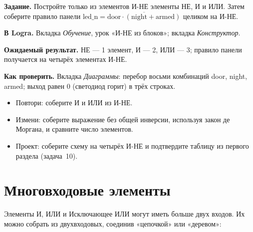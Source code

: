 \begin{diybox}[Всё из И-НЕ]
\textbf{Задание.} Постройте только из элементов И-НЕ элементы НЕ, И и ИЛИ.
Затем соберите правило панели $\text{led\_n}=\overline{\text{door}\cdot
(\text{night}+\text{armed})}$ целиком на И-НЕ.\par
\textbf{В Logra.} Вкладка \emph{Обучение}, урок «И-НЕ из блоков»; вкладка
\emph{Конструктор}.\par
\textbf{Ожидаемый результат.} НЕ --- 1 элемент, И --- 2, ИЛИ --- 3; правило
панели получается на четырёх элементах И-НЕ.\par
\textbf{Как проверить.} Вкладка \emph{Диаграммы}: перебор восьми комбинаций
door, night, armed; выход  равен 0 (светодиод горит) в трёх
строках.
\begin{itemize}[leftmargin=3.4em,labelwidth=3em,labelsep=0.4em,align=left]
  \item[\stars{1}] Повтори: соберите И и ИЛИ из И-НЕ.
  \item[\stars{2}] Измени: соберите выражение без общей инверсии, используя закон
    де Моргана, и сравните число элементов.
  \item[\stars{3}] Проект: соберите схему на четырёх И-НЕ и подтвердите
    таблицу из первого раздела (задача~10).
\end{itemize}
\end{diybox}

\section{Многовходовые элементы}

Элементы И, ИЛИ и Исключающее ИЛИ могут иметь больше двух входов. Их можно
собрать из двухвходовых, соединив «цепочкой» или «деревом»:

